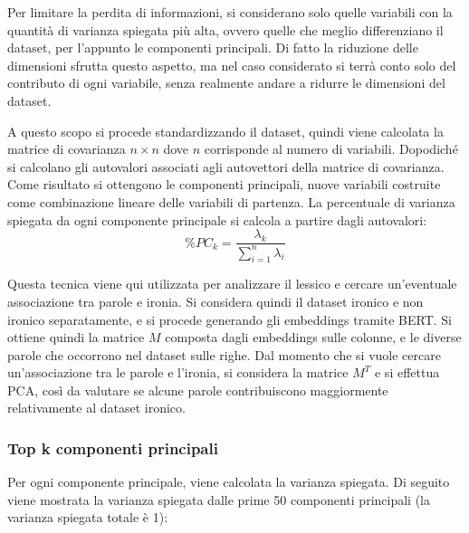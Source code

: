 \documentclass[oneside]{book}
\begin{document}
Per limitare la perdita di informazioni, si considerano solo quelle variabili con la quantità di varianza spiegata più alta, ovvero quelle che meglio differenziano il dataset, per l'appunto le componenti principali. Di fatto la riduzione delle dimensioni sfrutta questo aspetto, ma nel caso considerato si terrà conto solo del contributo di ogni variabile, senza realmente andare a ridurre le dimensioni del dataset.

A questo scopo si procede standardizzando il dataset, quindi viene calcolata la matrice di covarianza $n \times n$ dove $n$ corrisponde al numero di variabili. Dopodiché si calcolano gli autovalori associati agli autovettori della matrice di covarianza. Come risultato si ottengono le componenti principali, nuove variabili costruite come combinazione lineare delle variabili di partenza. La percentuale di varianza spiegata da ogni componente principale si calcola a partire dagli autovalori: $$\%PC_k = \frac{\lambda_k}{\sum_{i=1}^n \lambda_i}$$

Questa tecnica viene qui utilizzata per analizzare il lessico e cercare un'eventuale associazione tra parole e ironia. Si considera quindi il dataset ironico e non ironico separatamente, e si procede generando gli embeddings tramite BERT. Si ottiene quindi la matrice $M$ composta dagli embeddings sulle colonne, e le diverse parole che occorrono nel dataset sulle righe. Dal momento che si vuole cercare un'associazione tra le parole e l'ironia, si considera la matrice $M^T$ e si effettua PCA, così da valutare se alcune parole contribuiscono maggiormente relativamente al dataset ironico.

\subsubsection{Top k componenti principali}
Per ogni componente principale, viene calcolata la varianza spiegata. Di seguito viene mostrata la varianza spiegata dalle prime 50 componenti principali (la varianza spiegata totale è 1):
\end{document}
